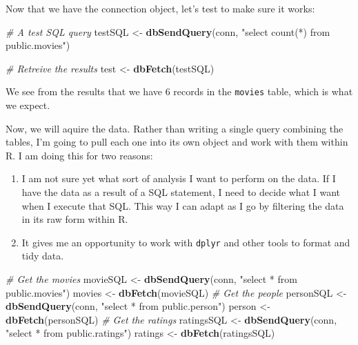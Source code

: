 \documentclass[]{article}
\newenvironment{Shaded}{\begin{snugshade}}{\end{snugshade}}
\newcommand{\KeywordTok}[1]{\textcolor[rgb]{0.13,0.29,0.53}{\textbf{#1}}}
\newcommand{\StringTok}[1]{\textcolor[rgb]{0.31,0.60,0.02}{#1}}
\newcommand{\CommentTok}[1]{\textcolor[rgb]{0.56,0.35,0.01}{\textit{#1}}}
\newcommand{\NormalTok}[1]{#1}
\begin{document}
Now that we have the connection object, let's test to make sure it
works:

\begin{Shaded}
\begin{Highlighting}[]
\CommentTok{# A test SQL query}
\NormalTok{testSQL <-}\StringTok{ }\KeywordTok{dbSendQuery}\NormalTok{(conn, }\StringTok{"select count(*) from public.movies"}\NormalTok{)}

\CommentTok{# Retreive the results}
\NormalTok{test <-}\StringTok{ }\KeywordTok{dbFetch}\NormalTok{(testSQL)}
\end{Highlighting}
\end{Shaded}

We see from the results that we have 6 records in the \texttt{movies}
table, which is what we expect.

Now, we will aquire the data. Rather than writing a single query
combining the tables, I'm going to pull each one into its own object and
work with them within R. I am doing this for two reasons:

\begin{enumerate}
\def\labelenumi{\arabic{enumi}.}
\item
  I am not sure yet what sort of analysis I want to perform on the data.
  If I have the data as a result of a SQL statement, I need to decide
  what I want when I execute that SQL. This way I can adapt as I go by
  filtering the data in its raw form within R.
\item
  It gives me an opportunity to work with \texttt{dplyr} and other tools
  to format and tidy data.
\end{enumerate}

\begin{Shaded}
\begin{Highlighting}[]
\CommentTok{# Get the movies}
\NormalTok{movieSQL <-}\StringTok{ }\KeywordTok{dbSendQuery}\NormalTok{(conn, }\StringTok{"select * from public.movies"}\NormalTok{)}
\NormalTok{movies <-}\StringTok{ }\KeywordTok{dbFetch}\NormalTok{(movieSQL)}
\CommentTok{# Get the people}
\NormalTok{personSQL <-}\StringTok{ }\KeywordTok{dbSendQuery}\NormalTok{(conn, }\StringTok{"select * from public.person"}\NormalTok{)}
\NormalTok{person <-}\StringTok{ }\KeywordTok{dbFetch}\NormalTok{(personSQL)}
\CommentTok{# Get the ratings}
\NormalTok{ratingsSQL <-}\StringTok{ }\KeywordTok{dbSendQuery}\NormalTok{(conn, }\StringTok{"select * from public.ratings"}\NormalTok{)}
\NormalTok{ratings <-}\StringTok{ }\KeywordTok{dbFetch}\NormalTok{(ratingsSQL)}
\end{Highlighting}
\end{Shaded}
\end{document}
